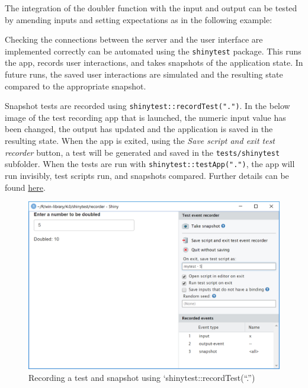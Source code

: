 \documentclass[
]{book}
\newenvironment{Shaded}{\begin{snugshade}}{\end{snugshade}}
\newcommand{\AttributeTok}[1]{\textcolor[rgb]{0.77,0.63,0.00}{#1}}
\newcommand{\CommentTok}[1]{\textcolor[rgb]{0.56,0.35,0.01}{\textit{#1}}}
\newcommand{\DecValTok}[1]{\textcolor[rgb]{0.00,0.00,0.81}{#1}}
\newcommand{\FunctionTok}[1]{\textcolor[rgb]{0.00,0.00,0.00}{#1}}
\newcommand{\NormalTok}[1]{#1}
\newcommand{\SpecialCharTok}[1]{\textcolor[rgb]{0.00,0.00,0.00}{#1}}
\newcommand{\StringTok}[1]{\textcolor[rgb]{0.31,0.60,0.02}{#1}}
\begin{document}
The integration of the doubler function with the input and output can be tested by amending inputs and setting expectations as in the following example:

\begin{Shaded}
\end{Shaded}

Checking the connections between the server and the user interface are implemented correctly can be automated using the \texttt{shinytest} package. This runs the app, records user interactions, and takes snapshots of the application state. In future runs, the saved user interactions are simulated and the resulting state compared to the appropriate snapshot.

Snapshot tests are recorded using \texttt{shinytest::recordTest(".")}. In the below image of the test recording app that is launched, the numeric input value has been changed, the output has updated and the application is saved in the resulting state. When the app is exited, using the \emph{Save script and exit test recorder} button, a test will be generated and saved in the \texttt{tests/shinytest} subfolder. When the tests are run with \texttt{shinytest::testApp(".")}, the app will run invisibly, test scripts run, and snapshots compared. Further details can be found \href{https://rstudio.github.io/shinytest/articles/shinytest.html}{here}.

\begin{figure}
\centering
\includegraphics{screenshot.PNG}
\caption{Recording a test and snapshot using `shinytest::recordTest(``.'')}
\end{figure}
\end{document}
